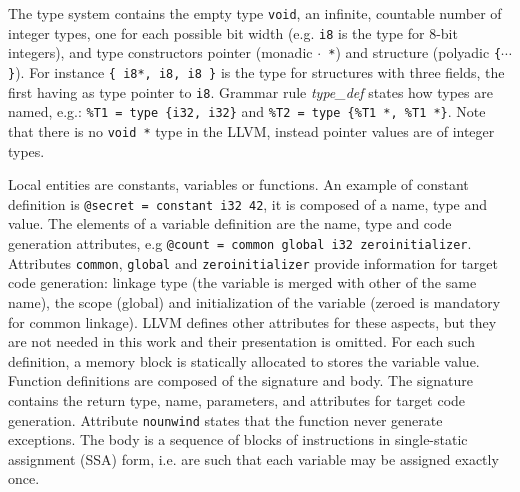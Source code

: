 \documentclass{llncs}
\newcommand{\llvm}[1]{\texttt{#1}}
\newcommand{\nt}[1]{{\normalfont\textit{#1}}}
\begin{document}
The type system contains the empty type \llvm{void}, an infinite, countable
number of integer types, one for each possible bit width (e.g. \llvm{i8} is the
type for 8-bit integers), and type constructors pointer (monadic \llvm{$\cdot$
  *}) and structure (polyadic \llvm{\{$\cdots$\}}). For instance \llvm{\{ i8*,
  i8, i8 \}} is the type for structures with three fields, the first having as
type pointer to \llvm{i8}. Grammar rule \nt{type\_def} states how types are
named, e.g.: \llvm{\%T1 = type \{i32, i32\}} and \llvm{\%T2 = type \{\%T1 *,
  \%T1 *\}}. Note that there is no \llvm{void *} type in the LLVM, instead
pointer values are of integer types. 

Local entities are constants, variables or functions. An example of constant
definition is \llvm{@secret = constant i32 42}, it is composed of a name, type
and value. The elements of a variable definition are the name, type and code
generation attributes, e.g \llvm{@count = common global i32 zeroinitializer}.
Attributes \llvm{common}, \llvm{global} and \llvm{zeroinitializer} provide
information for target code generation: linkage type (the variable is merged
with other of the same name), the scope (global) and initialization of the
variable (zeroed is mandatory for common linkage). LLVM defines other attributes
for these aspects, but they are not needed in this work and their presentation
is omitted. For each such definition, a memory block is statically allocated to
stores the variable value. Function definitions are composed of the signature
and body. The signature contains the return type, name, parameters, and
attributes for target code generation. Attribute \llvm{nounwind} states that the
function never generate exceptions. The body is a sequence of blocks of
instructions in single-static assignment (SSA) form, i.e. are such that each
variable may be assigned exactly once.
\end{document}
